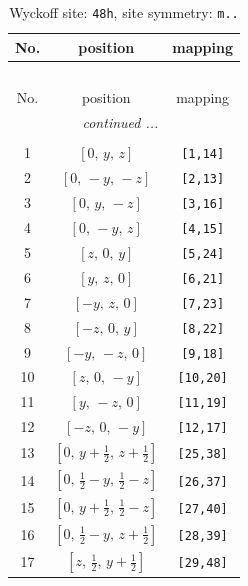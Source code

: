 \documentclass[fleqn,8pt]{jsarticle}
\begin{document}
\begin{longtable}{ccc}
\caption{Wyckoff site: {\tt 48h}, site symmetry: {\tt m..}}
 \\
 \hline \hline
No. & position & mapping \\ \hline \endfirsthead

\multicolumn{2}{l}{\tablename\ \thetable{}} \\
 \hline \hline
No. & position & mapping \\ \hline \endhead

 \hline \hline
\multicolumn{2}{r}{\footnotesize\it continued ...} \\ \endfoot

 \hline \hline
\multicolumn{2}{r}{} \\ \endlastfoot

1 & $\left[ 0,\, y,\, z \right]$ & {\tt [1,14]} \\ \hline
2 & $\left[ 0,\, - y,\, - z \right]$ & {\tt [2,13]} \\ \hline
3 & $\left[ 0,\, y,\, - z \right]$ & {\tt [3,16]} \\ \hline
4 & $\left[ 0,\, - y,\, z \right]$ & {\tt [4,15]} \\ \hline
5 & $\left[ z,\, 0,\, y \right]$ & {\tt [5,24]} \\ \hline
6 & $\left[ y,\, z,\, 0 \right]$ & {\tt [6,21]} \\ \hline
7 & $\left[ - y,\, z,\, 0 \right]$ & {\tt [7,23]} \\ \hline
8 & $\left[ - z,\, 0,\, y \right]$ & {\tt [8,22]} \\ \hline
9 & $\left[ - y,\, - z,\, 0 \right]$ & {\tt [9,18]} \\ \hline
10 & $\left[ z,\, 0,\, - y \right]$ & {\tt [10,20]} \\ \hline
11 & $\left[ y,\, - z,\, 0 \right]$ & {\tt [11,19]} \\ \hline
12 & $\left[ - z,\, 0,\, - y \right]$ & {\tt [12,17]} \\ \hline
13 & $\left[ 0,\, y + \frac{1}{2},\, z + \frac{1}{2} \right]$ & {\tt [25,38]} \\ \hline
14 & $\left[ 0,\, \frac{1}{2} - y,\, \frac{1}{2} - z \right]$ & {\tt [26,37]} \\ \hline
15 & $\left[ 0,\, y + \frac{1}{2},\, \frac{1}{2} - z \right]$ & {\tt [27,40]} \\ \hline
16 & $\left[ 0,\, \frac{1}{2} - y,\, z + \frac{1}{2} \right]$ & {\tt [28,39]} \\ \hline
17 & $\left[ z,\, \frac{1}{2},\, y + \frac{1}{2} \right]$ & {\tt [29,48]} \\ \hline

\end{longtable}
\end{document}
